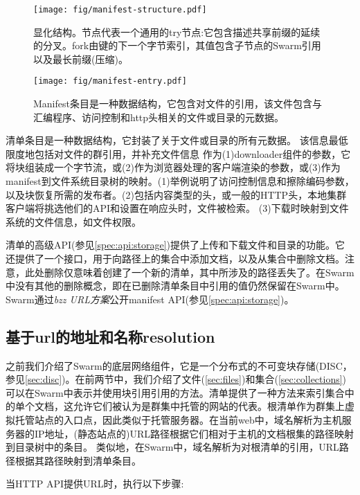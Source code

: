 \begin{figure}[htbp]
\centering
\texttt{[image: fig/manifest-structure.pdf]}
\caption[清单结构\statusgreen]{显化结构。节点代表一个通用的try节点:它包含描述共享前缀的延续的分叉。fork由键的下一个字节索引，其值包含子节点的Swarm引用以及最长前缀(压缩)。}
\label{fig:manifest-structure}
\end{figure}

\begin{figure}[htbp]
\centering
\texttt{[image: fig/manifest-entry.pdf]}
\caption[清单条目\statusgreen]{Manifest条目是一种数据结构，它包含对文件的引用，该文件包含与汇编程序、访问控制和http头相关的文件或目录的元数据。}
\label{fig:manifest-entry}
\end{figure}

清单条目是一种数据结构，它封装了关于文件或目录的所有元数据。
该信息最低限度地包括对文件的群引用，并补充文件信息
作为(1)downloader组件的参数，它将块组装成一个字节流，或(2)作为浏览器处理的客户端渲染的参数，或(3)作为manifest到文件系统目录树的映射。(1)举例说明了访问控制信息和擦除编码参数，以及块恢复所需的发布者。(2)包括内容类型的头，或一般的HTTP头，本地集群客户端将挑选他们的API和设置在响应头时，文件被检索。
(3)下载时映射到文件系统的文件信息，如文件权限。

清单的高级API(参见\ref{spec:api:storage})提供了上传和下载文件和目录的功能。它还提供了一个接口，用于向路径上的集合中添加文档，以及从集合中删除文档。注意，此处删除仅意味着创建了一个新的清单，其中所涉及的路径丢失了。在Swarm中没有其他的删除概念，即在已删除清单条目中引用的值仍然保留在Swarm中。Swarm通过\emph{bzz URL方案}公开manifest API(参见\ref{spec:api:storage})。

\subsection{基于url的地址和名称resolution\statusgreen}\label{sec:urls}

之前我们介绍了Swarm的底层网络组件，它是一个分布式的不可变块存储(DISC，参见\ref{sec:disc})。在前两节中，我们介绍了文件(\ref{sec:files})和集合(\ref{sec:collections})可以在Swarm中表示并使用块引用引用的方法。清单提供了一种方法来索引集合中的单个文档，这允许它们被认为是群集中托管的网站的代表。根清单作为群集上虚拟托管站点的入口点，因此类似于托管服务器。在当前web中，域名解析为主机服务器的IP地址，(静态站点的)URL路径根据它们相对于主机的文档根集的路径映射到目录树中的条目。
类似地，在Swarm中，域名解析为对根清单的引用，URL路径根据其路径映射到清单条目。

当HTTP API提供URL时，执行以下步骤:

